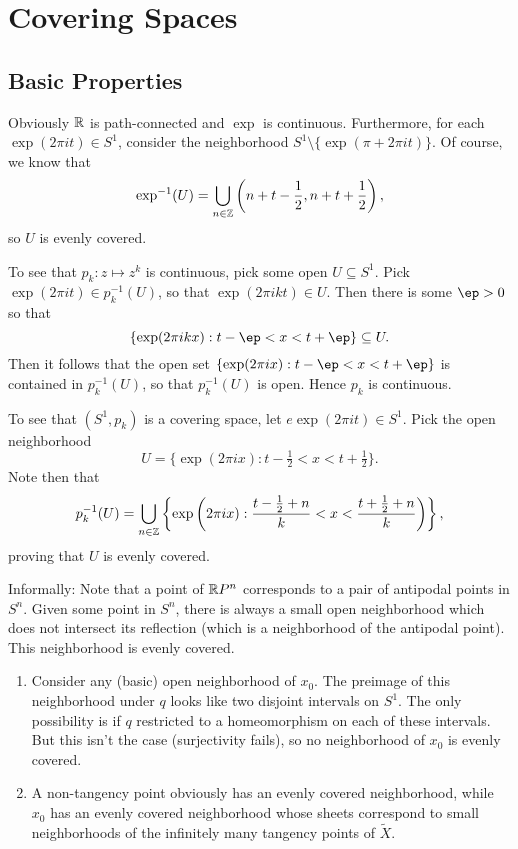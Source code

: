 \documentclass[../../solutions.tex]{subfiles}
\begin{document}
\section{Covering Spaces}
\subsection{Basic Properties}
\begin{exercise} \leavevmode
Obviously $\mathbb{R}$ is path-connected and $\exp$ is continuous.
Furthermore, for each $\exp(2\pi it)\in S^1$, consider the neighborhood $S^1\setminus\{\exp(\pi+2\pi it)\}$.
Of course, we know that
\[\exp^{-1}(U)=\bigcup_{n\in\mathbb{Z}}\left(n+t-\frac12,n+t+\frac12\right),\]
so $U$ is evenly covered.
\end{exercise}

\begin{exercise} \leavevmode
To see that $p_k:z\mapsto z^k$ is continuous, pick some open $U\subseteq S^1$.
Pick $\exp(2\pi it)\in p_k^{-1}(U)$, so that $\exp(2\pi ikt)\in U$.
Then there is some $\ep>0$ so that
\[\{\exp(2\pi ikx):t-\ep<x<t+\ep\}\subseteq U.\]
Then it follows that the open set $\{\exp(2\pi ix):t-\ep<x<t+\ep\}$ is contained in $p_k^{-1}(U)$, so that $p_k^{-1}(U)$ is open.
Hence $p_k$ is continuous.

To see that $(S^1,p_k)$ is a covering space, let $e\exp(2\pi it)\in S^1$.
Pick the open neighborhood
\[U=\{\exp(2\pi ix):t-\tfrac12<x<t+\tfrac12\}.\]
Note then that
\[p_k^{-1}(U)=\bigcup_{n\in\mathbb{Z}}\left\{\exp\left(2\pi ix):\frac{t-\frac12+n}{k}<x<\frac{t+\frac12+n}{k}\right)\right\},\]
proving that $U$ is evenly covered.
\end{exercise}

\begin{exercise} \leavevmode
Informally:
Note that a point of $\mathbb{R} P^n$ corresponds to a pair of antipodal points in $S^n$.
Given some point in $S^n$, there is always a small open neighborhood which does not intersect its reflection (which is a neighborhood of the antipodal point).
This neighborhood is evenly covered.
\end{exercise}

\begin{exercise} \leavevmode
\begin{enumerate}
\item
Consider any (basic) open neighborhood of $x_0$.
The preimage of this neighborhood under $q$ looks like two disjoint intervals on $S^1$.
The only possibility is if $q$ restricted to a homeomorphism on each of these intervals.
But this isn't the case (surjectivity fails), so no neighborhood of $x_0$ is evenly covered.

\item
A non-tangency point obviously has an evenly covered neighborhood, while $x_0$ has an evenly covered neighborhood whose sheets correspond to small neighborhoods of the infinitely many tangency points of $\widetilde X$.
\end{enumerate}
\end{exercise}
\end{document}
